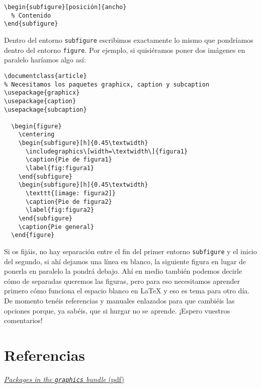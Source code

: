 \begin{lstlisting}[language={[latex]tex}]
\begin{subfigure}[posición]{ancho}
  % Contenido
\end{subfigure}
\end{lstlisting}

Dentro del entorno \lstinline!subfigure! escribimos exactamente lo mismo
que pondríamos dentro del entorno \lstinline!figure!. Por ejemplo, si
quisiéramos poner dos imágenes en paralelo haríamos algo así:

\begin{lstlisting}[language={[latex]tex}]
\documentclass{article}
% Necesitamos los paquetes graphicx, caption y subcaption
\usepackage{graphicx}
\usepackage{caption}
\usepackage{subcaption}

  \begin{figure}
    \centering
    \begin{subfigure}[h]{0.45\textwidth}
      \includegraphics\[width=\textwidth\]{figura1}
      \caption{Pie de figura1}
      \label{fig:figura1}
    \end{subfigure}
    \begin{subfigure}[h]{0.45\textwidth}
      \texttt{[image: figura2]}
      \caption{Pie de figura2}
      \label{fig:figura2}
    \end{subfigure}
    \caption{Pie general}
  \end{figure}

\end{lstlisting}

Si os fijáis, no hay separación entre el fin del primer entorno
\lstinline!subfigure! y el inicio del segundo, si ahí dejamos una línea
en blanco, la siguiente figura en lugar de ponerla en paralelo la pondrá
debajo. Ahí en medio también podemos decirle cómo de separadas queremos
las figuras, pero para eso necesitamos aprender primero cómo funciona el
espacio blanco en LaTeX y eso es tema para otro día. De momento tenéis
referencias y manuales enlazados para que cambiéis las opciones porque,
ya sabéis, que si hurgar no se aprende. ¡Espero vuestros comentarios!

\section{Referencias}\label{referencias4}

\href{http://ctan.math.utah.edu/ctan/tex-archive/macros/latex/required/graphics/grfguide.pdf}{\emph{Packages
in the \lstinline!graphics! bundle} (pdf)}

